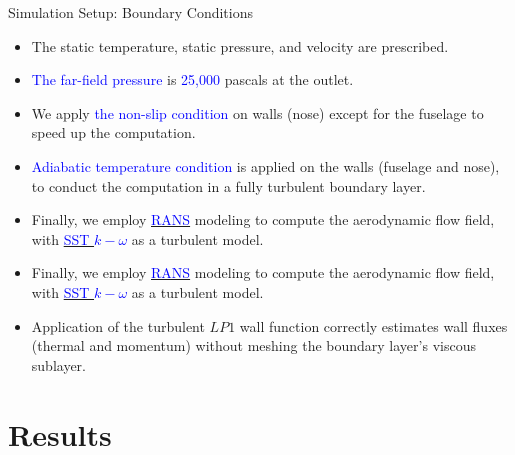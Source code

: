 \documentclass[aspectratio=169,xcolor=dvipsnames]{beamer}
\begin{document}
\begin{frame}{Simulation Setup: Boundary Conditions}
   \begin{itemize}
       \item The static temperature, static pressure, and velocity are prescribed. 
       \item \textcolor{blue}{The far-field pressure} is \textcolor{blue}{25,000} pascals at the outlet. 
       \item We apply \textcolor{blue}{the non-slip condition} on walls (nose) except for the fuselage to speed up the computation. 
       \item \textcolor{blue}{Adiabatic temperature condition} is applied on the walls (fuselage and nose), to conduct the computation in a fully turbulent boundary layer. 
       \item Finally, we employ  \href{https://resources.system-analysis.cadence.com/blog/msa2021-the-reynolds-averaged-navier-stokes-rans-equations-and-models}{\textcolor{blue}{RANS}} modeling to compute the aerodynamic flow field, with \href{https://turbmodels.larc.nasa.gov/sst.html}{\textcolor{blue}{SST $k-\omega$}} as a turbulent model. 
       \item Finally, we employ  \href{https://resources.system-analysis.cadence.com/blog/msa2021-the-reynolds-averaged-navier-stokes-rans-equations-and-models}{\textcolor{blue}{RANS}} modeling to compute the aerodynamic flow field, with \href{https://turbmodels.larc.nasa.gov/sst.html}{\textcolor{blue}{SST $k-\omega$}} as a turbulent model. 
       \item Application of the turbulent $LP1$ wall function correctly estimates wall fluxes (thermal and momentum) without meshing the boundary layer's viscous sublayer. 
   \end{itemize}
\end{frame}

\section{Results}
\end{document}
